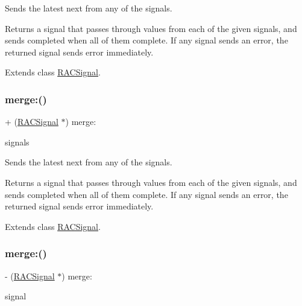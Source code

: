 Sends the latest {\ttfamily next} from any of the signals.

Returns a signal that passes through values from each of the given signals, and sends {\ttfamily completed} when all of them complete. If any signal sends an error, the returned signal sends {\ttfamily error} immediately. 

Extends class \mbox{\hyperlink{interface_r_a_c_signal_a37d7e9c259ad5253a1f3ff644a86e52b}{R\+A\+C\+Signal}}.

\mbox{\label{category_r_a_c_signal_07_operations_08_a37d7e9c259ad5253a1f3ff644a86e52b}} 
\subsubsection{\texorpdfstring{merge\+:()}{merge:()}\hspace{0.1cm}{\footnotesize\ttfamily [5/6]}}
{\footnotesize\ttfamily + (\mbox{\hyperlink{interface_r_a_c_signal}{R\+A\+C\+Signal}} $\ast$) merge\+: \begin{DoxyParamCaption}\item[{(id$<$ N\+S\+Fast\+Enumeration $>$)}]{signals }\end{DoxyParamCaption}}

Sends the latest {\ttfamily next} from any of the signals.

Returns a signal that passes through values from each of the given signals, and sends {\ttfamily completed} when all of them complete. If any signal sends an error, the returned signal sends {\ttfamily error} immediately. 

Extends class \mbox{\hyperlink{interface_r_a_c_signal_a37d7e9c259ad5253a1f3ff644a86e52b}{R\+A\+C\+Signal}}.

\mbox{\label{category_r_a_c_signal_07_operations_08_aeda66daaf146a2d218ba7819297628a9}} 
\subsubsection{\texorpdfstring{merge\+:()}{merge:()}\hspace{0.1cm}{\footnotesize\ttfamily [6/6]}}
{\footnotesize\ttfamily -\/ (\mbox{\hyperlink{interface_r_a_c_signal}{R\+A\+C\+Signal}} $\ast$) merge\+: \begin{DoxyParamCaption}\item[{(\mbox{\hyperlink{interface_r_a_c_signal}{R\+A\+C\+Signal}} $\ast$)}]{signal }\end{DoxyParamCaption}}

